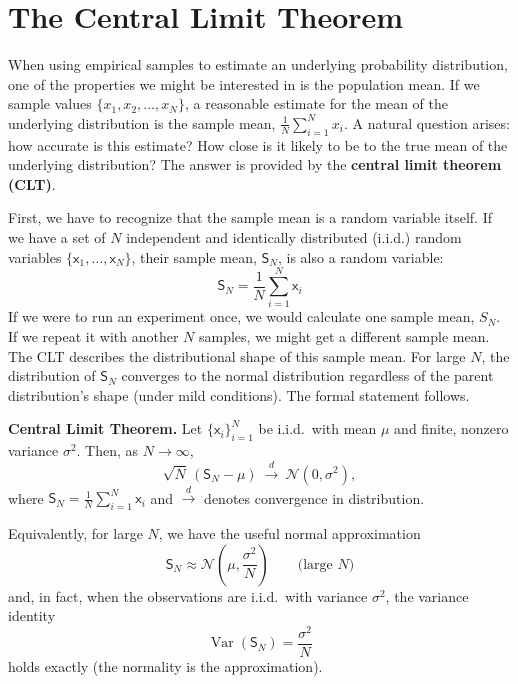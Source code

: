 \section{The Central Limit Theorem}
When using empirical samples to estimate an underlying probability distribution, one of the properties we might be interested in is the population mean. If we sample values $\{x_1, x_2, ..., x_N\}$, a reasonable estimate for the mean of the underlying distribution is the sample mean, $\frac{1}{N} \sum_{i=1}^N x_i$. A natural question arises: how accurate is this estimate? How close is it likely to be to the true mean of the underlying distribution? The answer is provided by the \textbf{central limit theorem (CLT)}.

First, we have to recognize that the sample mean is a random variable itself. If we have a set of $N$ independent and identically distributed (i.i.d.) random variables $\{\mathsf{x}_1, \dots, \mathsf{x}_N\}$, their sample mean, $\mathsf{S}_N$, is also a random variable:
\begin{equation}
    \mathsf{S}_N = \frac{1}{N}\sum_{i=1}^N \mathsf{x}_i
\end{equation}
If we were to run an experiment once, we would calculate one sample mean, $S_N$. If we repeat it with another $N$ samples, we might get a different sample mean. The CLT describes the distributional shape of this sample mean. For large $N$, the distribution of $\mathsf{S}_N$  converges to the normal distribution regardless of the parent distribution's shape (under mild conditions). The formal statement follows.

\begin{definitionBox}
    \textbf{Central Limit Theorem.}
    Let $\{\mathsf{x}_i\}_{i=1}^N$ be i.i.d.\ with mean $\mu$ and finite, nonzero variance $\sigma^2$. Then, as $N\to\infty$,
    \begin{equation}
        \sqrt{N}\,(\mathsf{S}_N-\mu)\ \xrightarrow{d}\ \mathcal{N}(0,\sigma^2),
    \end{equation}
    where $\mathsf{S}_N=\frac{1}{N}\sum_{i=1}^N \mathsf{x}_i$ and $\xrightarrow{d}$ denotes convergence in distribution.
\end{definitionBox}
Equivalently, for large $N$, we have the useful normal approximation
\begin{equation}
    \mathsf{S}_N \approx \mathcal{N}\!\left(\mu,\frac{\sigma^2}{N}\right)  \qquad\text{(large $N$)}
\end{equation}
and, in fact, when the observations are i.i.d.\ with variance $\sigma^2$, the variance identity
\begin{equation}
    \operatorname{Var}(\mathsf{S}_N)=\frac{\sigma^2}{N}
\end{equation}
holds exactly (the normality is the approximation).

